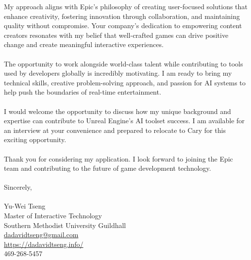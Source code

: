 \documentclass{article}
\begin{document}
    My approach aligns with Epic's philosophy of creating user-focused solutions that enhance creativity, fostering innovation through collaboration, and maintaining quality without compromise. Your company's dedication to empowering content creators resonates with my belief that well-crafted games can drive positive change and create meaningful interactive experiences.
    \\
    \\
    The opportunity to work alongside world-class talent while contributing to tools used by developers globally is incredibly motivating. I am ready to bring my technical skills, creative problem-solving approach, and passion for AI systems to help push the boundaries of real-time entertainment.
    \\
    \\
    I would welcome the opportunity to discuss how my unique background and expertise can contribute to Unreal Engine's AI toolset success. I am available for an interview at your convenience and prepared to relocate to Cary for this exciting opportunity.
    \\
    \\
    Thank you for considering my application. I look forward to joining the Epic team and contributing to the future of game development technology.
    \\
    \\
    Sincerely,
    \\
    \\
    Yu-Wei Tseng\\
    Master of Interactive Technology\\
    Southern Methodist University Guildhall\\
    {\href{mailto:dadavidtseng@gmail.com}{dadavidtseng@gmail.com}}\\
    {\href{https://dadavidtseng.info/}{https://dadavidtseng.info/}}\\
    469-268-5457\\
\end{document}
